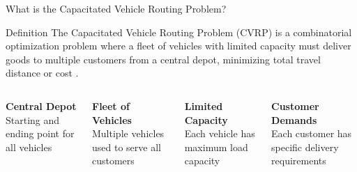 \documentclass{beamer}
\begin{document}
\begin{frame}{What is the Capacitated Vehicle Routing Problem?}

\begin{block}{Definition}
The Capacitated Vehicle Routing Problem (CVRP) is a combinatorial optimization problem where a fleet of vehicles with limited capacity must deliver goods to multiple customers from a central depot, minimizing total travel distance or cost \cite{augerat1995computational}.
\end{block}

\vspace{0.5cm}
\begin{columns}[t]

\begin{center}
\textbf{Central Depot}\\
\vspace{0.2cm}
Starting and ending point for all vehicles
\end{center}

\begin{center}
\textbf{Fleet of Vehicles}\\
\vspace{0.2cm}
Multiple vehicles used to serve all customers
\end{center}

\begin{center}
\textbf{Limited Capacity}\\
\vspace{0.2cm}
Each vehicle has maximum load capacity
\end{center}

\begin{center}
\textbf{Customer Demands}\\
\vspace{0.2cm}
Each customer has specific delivery requirements
\end{center}

\end{columns}

\end{frame}
\end{document}
